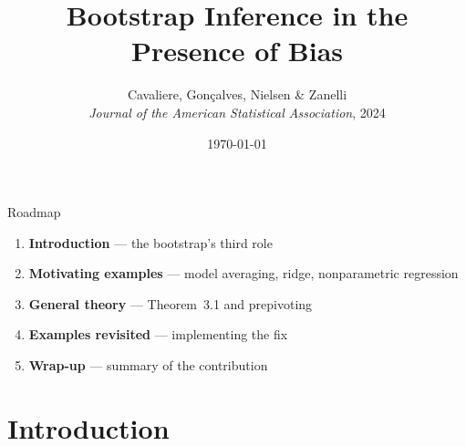 \documentclass[10pt,aspectratio=169]{beamer}
\title{Bootstrap Inference in the Presence of Bias}
\subtitle{Cavaliere, Gon\c{c}alves, Nielsen \& Zanelli\\ \footnotesize\textit{Journal of the American Statistical Association}, 2024}
\institute{Toulouse School of Economics --- Econometrics Reading Group}
\date{\today}
\theoremstyle{plain}
\begin{document}

{
\begin{frame}[plain]
  \titlepage
\end{frame}
}


\begin{frame}{Roadmap}
  \begin{enumerate}
    \setlength{\itemsep}{12pt}
    \item \textbf{Introduction} --- the bootstrap's third role
    \item \textbf{Motivating examples} --- model averaging, ridge, nonparametric regression
    \item \textbf{General theory} --- Theorem~3.1 and prepivoting
    \item \textbf{Examples revisited} --- implementing the fix
    \item \textbf{Wrap-up} --- summary of the contribution
  \end{enumerate}
\end{frame}
\section{Introduction}
\end{document}
